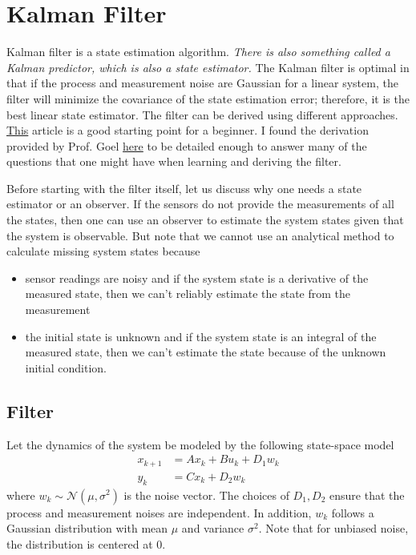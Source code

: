 \section{Kalman Filter}
\hspace{\parindent}Kalman filter is a state estimation algorithm. \textit{There is also something called a Kalman predictor, which is also a state estimator.} The Kalman filter is optimal in that if the process and measurement noise are Gaussian for a linear system, the filter will minimize the covariance of the state estimation error; therefore, it is the best linear state estimator. The filter can be derived using different approaches. \href{https://ieeexplore.ieee.org/document/6279585}{This} article is a good starting point for a beginner. I found the derivation provided by Prof. Goel \href{https://www.youtube.com/watch?v=bVj_EfWFvqs}{here} to be detailed enough to answer many of the questions that one might have when learning and deriving the filter.

Before starting with the filter itself, let us discuss why one needs a state estimator or an observer. If the sensors do not provide the measurements of all the states, then one can use an observer to estimate the system states given that the system is observable. But note that we cannot use an analytical method to calculate missing system states because
\begin{itemize}
    \item sensor readings are noisy and if the system state is a derivative of the measured state, then we can't reliably estimate the state from the measurement
    \item the initial state is unknown and if the system state is an integral of the measured state, then we can't estimate the state because of the unknown initial condition.
\end{itemize}

\subsection{Filter}
\hspace{\parindent}Let the dynamics of the system be modeled by the following state-space model
\begin{align}
    x_{k+1} &= A x_k + B u_k + D_1 w_k \\
    y_k &= C x_k + D_2 w_k
    \label{eqn:stateSpaceModelWNoise}
\end{align}
where $w_k \sim\mathcal{N}(\mu, \sigma^2)$ is the noise vector. The choices of $D_1, D_2$ ensure that the process and measurement noises are independent. In addition, $w_k$ follows a Gaussian distribution with mean $\mu$ and variance $\sigma^2$. Note that for unbiased noise, the distribution is centered at $0$.

